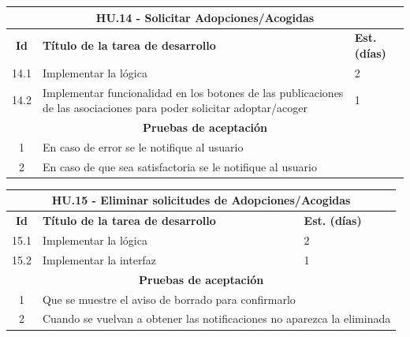\begin{table}[H]
	\centering
	\hspace*{-0.5cm}
\begin{tabular}{|c|p{9.5cm}|p{1cm}|}
	\hline
	\multicolumn{3}{|c|}{\textbf{HU.14 - Solicitar Adopciones/Acogidas}} \\
	\hline
	\textbf{Id} & \textbf{Título de la tarea de desarrollo} & \textbf{Est. (días)} \\
	\hline
	14.1 &  Implementar la lógica & 2 \\ \hline
	14.2 &  Implementar funcionalidad en los botones de las publicaciones de las asociaciones para poder solicitar adoptar/acoger & 1 \\ \hline
	\multicolumn{3}{|c|}{\textbf{Pruebas de aceptación}} \\ \hline
	1 & \multicolumn{2}{|p{12cm}|}{En caso de error se le notifique al usuario} \\ \hline
	2 & \multicolumn{2}{|p{12cm}|}{En caso de que sea satisfactoria se le notifique al usuario} \\ \hline
	
\end{tabular} 
\end{table}


\begin{table}[H]
	\centering
\begin{tabular}{|c|p{9.5cm}|p{1cm}|}
	\hline
	\multicolumn{3}{|c|}{\textbf{HU.15 - Eliminar solicitudes de Adopciones/Acogidas}} \\
	\hline
	\textbf{Id} & \textbf{Título de la tarea de desarrollo} & \textbf{Est. (días)} \\
	\hline
	15.1 & Implementar la lógica & 2 \\ \hline
	15.2 & Implementar la interfaz & 1 \\ \hline 
	\multicolumn{3}{|c|}{\textbf{Pruebas de aceptación}} \\ \hline
	1 & \multicolumn{2}{|p{12cm}|}{Que se muestre el aviso de borrado para confirmarlo} \\ \hline
	2 & \multicolumn{2}{|p{12cm}|}{Cuando se vuelvan a obtener las notificaciones no aparezca la eliminada} \\ \hline
	
\end{tabular}
\end{table}


